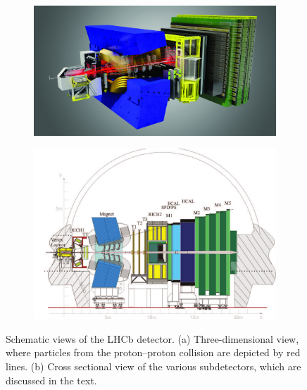 \begin{figure}[ptb]
  \centering
  \begin{subfigure}{0.78\textwidth}
    \includegraphics[width=\textwidth]{graphics/intro/detector_3D_CMYK}
    \caption{}
    \label{fig:LHCb_3D}
  \end{subfigure}

  \vspace*{0.03\textwidth}
  \begin{subfigure}{\textwidth}
    \includegraphics[width=\textwidth]{graphics/intro/detector_cross_cmyk}
    \caption{}
    \label{fig:LHCb_cross}
  \end{subfigure}

  \caption{Schematic views of the LHCb detector.
           (a) Three-dimensional view, where particles from the proton--proton collision are depicted by red lines.
           (b) Cross sectional view of the various subdetectors, which are discussed in the text.}
  \label{fig:LHCb}
\end{figure}

